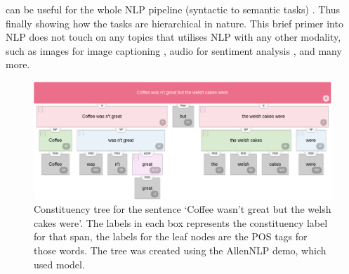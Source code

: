 \citep{devlin-etal-2019-bert} can be useful for the whole NLP pipeline (syntactic to semantic tasks) \citep{tenney-etal-2019-bert}. Thus finally showing how the tasks are hierarchical in nature. This brief primer into NLP does not touch on any topics that utilises NLP with any other modality, such as images for image captioning \citep{Karpathy_2015_CVPR}, audio for sentiment analysis \citep{raaijmakers-etal-2008-multimodal}, and many more.








\begin{figure}[!h]
    \centering
    \includegraphics[scale=0.28]{images/lit_review/constituency_tree.png}
    \caption{Constituency tree for the sentence `Coffee wasn't great but the welsh cakes were'. The labels in each box represents the constituency label for that span, the labels for the leaf nodes are the POS tags for those words. The tree was created using the AllenNLP demo, which used \citet{joshi-etal-2018-extending} model.}
    \label{fig:lit_review_constituency_tree}
\end{figure}


